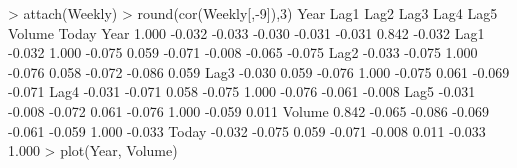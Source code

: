 \documentclass[
]{article}
\newenvironment{Shaded}{\begin{snugshade}}{\end{snugshade}}
\newcommand{\DecValTok}[1]{\textcolor[rgb]{0.00,0.00,0.81}{#1}}
\newcommand{\FloatTok}[1]{\textcolor[rgb]{0.00,0.00,0.81}{#1}}
\newcommand{\FunctionTok}[1]{\textcolor[rgb]{0.00,0.00,0.00}{#1}}
\newcommand{\NormalTok}[1]{#1}
\newcommand{\SpecialCharTok}[1]{\textcolor[rgb]{0.00,0.00,0.00}{#1}}
\begin{document}
\begin{Shaded}
\begin{Highlighting}[]
\SpecialCharTok{\textgreater{}} \FunctionTok{attach}\NormalTok{(Weekly)}
\SpecialCharTok{\textgreater{}} \FunctionTok{round}\NormalTok{(}\FunctionTok{cor}\NormalTok{(Weekly[,}\SpecialCharTok{{-}}\DecValTok{9}\NormalTok{]),}\DecValTok{3}\NormalTok{)}
\NormalTok{         Year   Lag1   Lag2   Lag3   Lag4   Lag5 Volume  Today}
\NormalTok{Year    }\FloatTok{1.000} \SpecialCharTok{{-}}\FloatTok{0.032} \SpecialCharTok{{-}}\FloatTok{0.033} \SpecialCharTok{{-}}\FloatTok{0.030} \SpecialCharTok{{-}}\FloatTok{0.031} \SpecialCharTok{{-}}\FloatTok{0.031}  \FloatTok{0.842} \SpecialCharTok{{-}}\FloatTok{0.032}
\NormalTok{Lag1   }\SpecialCharTok{{-}}\FloatTok{0.032}  \FloatTok{1.000} \SpecialCharTok{{-}}\FloatTok{0.075}  \FloatTok{0.059} \SpecialCharTok{{-}}\FloatTok{0.071} \SpecialCharTok{{-}}\FloatTok{0.008} \SpecialCharTok{{-}}\FloatTok{0.065} \SpecialCharTok{{-}}\FloatTok{0.075}
\NormalTok{Lag2   }\SpecialCharTok{{-}}\FloatTok{0.033} \SpecialCharTok{{-}}\FloatTok{0.075}  \FloatTok{1.000} \SpecialCharTok{{-}}\FloatTok{0.076}  \FloatTok{0.058} \SpecialCharTok{{-}}\FloatTok{0.072} \SpecialCharTok{{-}}\FloatTok{0.086}  \FloatTok{0.059}
\NormalTok{Lag3   }\SpecialCharTok{{-}}\FloatTok{0.030}  \FloatTok{0.059} \SpecialCharTok{{-}}\FloatTok{0.076}  \FloatTok{1.000} \SpecialCharTok{{-}}\FloatTok{0.075}  \FloatTok{0.061} \SpecialCharTok{{-}}\FloatTok{0.069} \SpecialCharTok{{-}}\FloatTok{0.071}
\NormalTok{Lag4   }\SpecialCharTok{{-}}\FloatTok{0.031} \SpecialCharTok{{-}}\FloatTok{0.071}  \FloatTok{0.058} \SpecialCharTok{{-}}\FloatTok{0.075}  \FloatTok{1.000} \SpecialCharTok{{-}}\FloatTok{0.076} \SpecialCharTok{{-}}\FloatTok{0.061} \SpecialCharTok{{-}}\FloatTok{0.008}
\NormalTok{Lag5   }\SpecialCharTok{{-}}\FloatTok{0.031} \SpecialCharTok{{-}}\FloatTok{0.008} \SpecialCharTok{{-}}\FloatTok{0.072}  \FloatTok{0.061} \SpecialCharTok{{-}}\FloatTok{0.076}  \FloatTok{1.000} \SpecialCharTok{{-}}\FloatTok{0.059}  \FloatTok{0.011}
\NormalTok{Volume  }\FloatTok{0.842} \SpecialCharTok{{-}}\FloatTok{0.065} \SpecialCharTok{{-}}\FloatTok{0.086} \SpecialCharTok{{-}}\FloatTok{0.069} \SpecialCharTok{{-}}\FloatTok{0.061} \SpecialCharTok{{-}}\FloatTok{0.059}  \FloatTok{1.000} \SpecialCharTok{{-}}\FloatTok{0.033}
\NormalTok{Today  }\SpecialCharTok{{-}}\FloatTok{0.032} \SpecialCharTok{{-}}\FloatTok{0.075}  \FloatTok{0.059} \SpecialCharTok{{-}}\FloatTok{0.071} \SpecialCharTok{{-}}\FloatTok{0.008}  \FloatTok{0.011} \SpecialCharTok{{-}}\FloatTok{0.033}  \FloatTok{1.000}
\SpecialCharTok{\textgreater{}} \FunctionTok{plot}\NormalTok{(Year, Volume)}
\end{Highlighting}
\end{Shaded}
\end{document}
